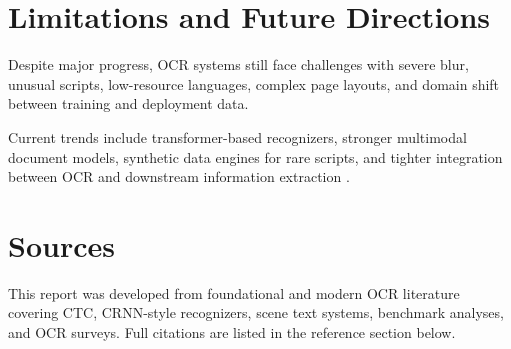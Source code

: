 \documentclass[11pt]{article}
\begin{document}
\section{Limitations and Future Directions}
Despite major progress, OCR systems still face challenges with severe blur, unusual scripts, low-resource languages, complex page layouts, and domain shift between training and deployment data.

Current trends include transformer-based recognizers, stronger multimodal document models, synthetic data engines for rare scripts, and tighter integration between OCR and downstream information extraction \cite{li2021trba,long2021survey}.

\section{Sources}
This report was developed from foundational and modern OCR literature covering CTC, CRNN-style recognizers, scene text systems, benchmark analyses, and OCR surveys. Full citations are listed in the reference section below.

\printbibliography
\end{document}
